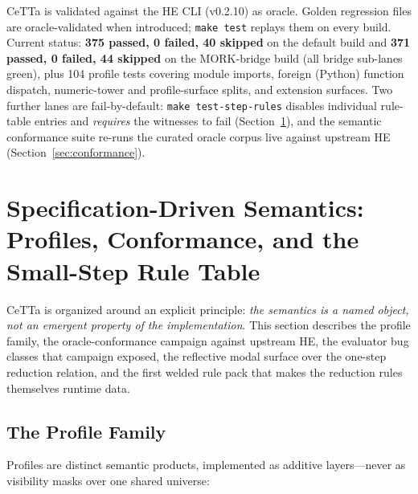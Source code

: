 \documentclass[11pt]{article}
\newcommand{\code}[1]{\texttt{#1}}
\newcommand{\HE}{\textup{HE}}
\newcommand{\CeTTa}{\textup{CeTTa}}
\begin{document}
\CeTTa{} is validated against the \HE{} CLI (v0.2.10) as oracle.
Golden regression files are oracle-validated when introduced;
\code{make test} replays them on every build.  Current status:
\textbf{375 passed, 0 failed, 40 skipped} on the default build and
\textbf{371 passed, 0 failed, 44 skipped} on the MORK-bridge build
(all bridge sub-lanes green), plus 104 profile tests covering module
imports, foreign (Python) function dispatch, numeric-tower and
profile-surface splits, and extension surfaces.  Two further lanes are
fail-by-default: \code{make test-step-rules} disables individual
rule-table entries and \emph{requires} the witnesses to fail
(Section~\ref{sec:specdriven}), and the semantic conformance suite
re-runs the curated oracle corpus live against upstream \HE{}
(Section~\ref{sec:conformance}).

\section{Specification-Driven Semantics: Profiles, Conformance, and the
  Small-Step Rule Table}
\label{sec:specdriven}

\CeTTa{} is organized around an explicit principle: \emph{the semantics
is a named object, not an emergent property of the implementation}.
This section describes the profile family, the oracle-conformance
campaign against upstream \HE{}, the evaluator bug classes that
campaign exposed, the reflective modal surface over the one-step
reduction relation, and the first welded rule pack that makes the
reduction rules themselves runtime data.

\subsection{The Profile Family}
\label{sec:profiles}

Profiles are distinct semantic products, implemented as additive
layers---never as visibility masks over one shared universe:
\end{document}
